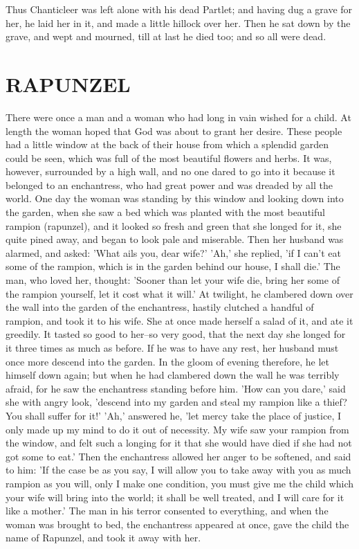 \documentclass[12pt]{book}
\begin{document}
Thus Chanticleer was left alone with his dead Partlet; and having dug
a grave for her, he laid her in it, and made a little hillock over
her. Then he sat down by the grave, and wept and mourned, till at last
he died too; and so all were dead.



\chapter{RAPUNZEL}

There were once a man and a woman who had long in vain wished for a
child. At length the woman hoped that God was about to grant her
desire. These people had a little window at the back of their house
from which a splendid garden could be seen, which was full of the most
beautiful flowers and herbs. It was, however, surrounded by a high
wall, and no one dared to go into it because it belonged to an
enchantress, who had great power and was dreaded by all the world. One
day the woman was standing by this window and looking down into the
garden, when she saw a bed which was planted with the most beautiful
rampion (rapunzel), and it looked so fresh and green that she longed
for it, she quite pined away, and began to look pale and miserable.
Then her husband was alarmed, and asked: 'What ails you, dear wife?'
'Ah,' she replied, 'if I can't eat some of the rampion, which is in
the garden behind our house, I shall die.' The man, who loved her,
thought: 'Sooner than let your wife die, bring her some of the rampion
yourself, let it cost what it will.' At twilight, he clambered down
over the wall into the garden of the enchantress, hastily clutched a
handful of rampion, and took it to his wife. She at once made herself
a salad of it, and ate it greedily. It tasted so good to her--so very
good, that the next day she longed for it three times as much as
before. If he was to have any rest, her husband must once more descend
into the garden. In the gloom of evening therefore, he let himself
down again; but when he had clambered down the wall he was terribly
afraid, for he saw the enchantress standing before him. 'How can you
dare,' said she with angry look, 'descend into my garden and steal my
rampion like a thief? You shall suffer for it!' 'Ah,' answered he,
'let mercy take the place of justice, I only made up my mind to do it
out of necessity. My wife saw your rampion from the window, and felt
such a longing for it that she would have died if she had not got some
to eat.' Then the enchantress allowed her anger to be softened, and
said to him: 'If the case be as you say, I will allow you to take away
with you as much rampion as you will, only I make one condition, you
must give me the child which your wife will bring into the world; it
shall be well treated, and I will care for it like a mother.' The man
in his terror consented to everything, and when the woman was brought
to bed, the enchantress appeared at once, gave the child the name of
Rapunzel, and took it away with her.
\end{document}
